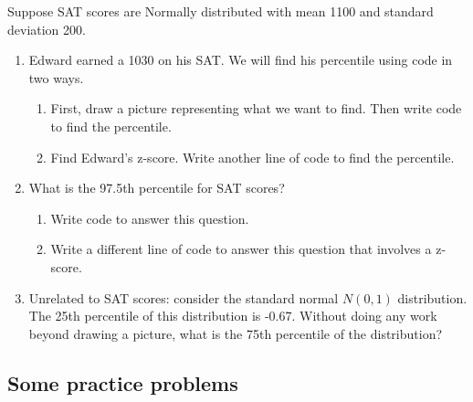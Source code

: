 \documentclass[
  letterpaper,
  DIV=11,
  numbers=noendperiod]{scrartcl}
\providecommand{\tightlist}{%
  \setlength{\itemsep}{0pt}\setlength{\parskip}{0pt}}\usepackage{longtable,booktabs,array}
\begin{document}
Suppose SAT scores are Normally distributed with mean 1100 and standard
deviation 200.

\begin{enumerate}
\def\labelenumi{\arabic{enumi}.}
\tightlist
\item
  Edward earned a 1030 on his SAT. We will find his percentile using
  code in two ways.

  \begin{enumerate}
  \def\labelenumii{\alph{enumii}.}
  \tightlist
  \item
    First, draw a picture representing what we want to find. Then write
    code to find the percentile.
  \item
    Find Edward's z-score. Write another line of code to find the
    percentile.
  \end{enumerate}
\item
  What is the 97.5th percentile for SAT scores?

  \begin{enumerate}
  \def\labelenumii{\alph{enumii}.}
  \tightlist
  \item
    Write code to answer this question.
  \item
    Write a different line of code to answer this question that involves
    a z-score.
  \end{enumerate}
\item
  Unrelated to SAT scores: consider the standard normal \(N(0,1)\)
  distribution. The 25th percentile of this distribution is -0.67.
  Without doing any work beyond drawing a picture, what is the 75th
  percentile of the distribution?
\end{enumerate}

\clearpage

\hypertarget{some-practice-problems}{%
\subsection{Some practice problems}\label{some-practice-problems}}
\end{document}
